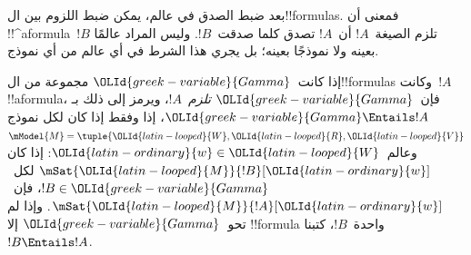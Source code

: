 \documentclass[../../../include/open-logic-section]{subfiles}
\begin{document}


\begin{explain}
  بعد ضبط الصدق في عالم، يمكن ضبط اللزوم بين ال!!{formula}s.
  فمعنى أن !!^a{formula}~$!B$ تلزم الصيغة~$!A$ أن~$!A$
  تصدق كلما صدقت~$!B$. وليس المراد عالمًا بعينه ولا نموذجًا بعينه؛
  بل يجري هذا الشرط في أي عالم من أي نموذج.
\end{explain}

\begin{defn}
  إذا كانت~${\OLId{greek-variable}{Gamma}}$ مجموعة من ال!!{formula}s وكانت~$!A$ !!a{formula}،
  فإن~${\OLId{greek-variable}{Gamma}}$ \emph{تلزم}~$!A$، ويرمز إلى ذلك بـ
  ${\OLId{greek-variable}{Gamma}} \Entails !A$، إذا وفقط إذا كان لكل نموذج
  $\mModel{M} = \tuple{{\OLId{latin-looped}{W}}, {\OLId{latin-looped}{R}}, {\OLId{latin-looped}{V}}}$ وعالم~${\OLId{latin-ordinary}{w}} \in {\OLId{latin-looped}{W}}$: إذا كان
  $\mSat{{\OLId{latin-looped}{M}}}{!B}[{\OLId{latin-ordinary}{w}}]$ لكل~$!B \in {\OLId{greek-variable}{Gamma}}$، فإن~$\mSat{{\OLId{latin-looped}{M}}}{!A}[{\OLId{latin-ordinary}{w}}]$.
  وإذا لم تحو~${\OLId{greek-variable}{Gamma}}$ إلا !!{formula} واحدة~$!B$، كتبنا
  $!B \Entails !A$.
\end{defn}
\end{document}
